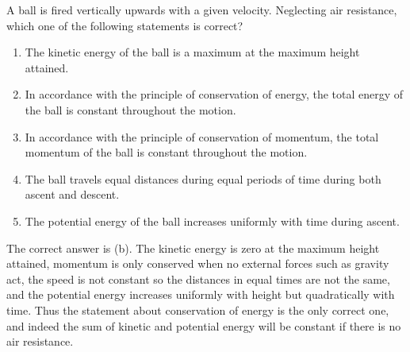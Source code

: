 
\begin{problem}[A1986PIQ4l] 
{A ball is fired vertically upwards with a given velocity. Neglecting air resistance, which one of the following statements is correct?
\begin{enumerate}
	\item The kinetic energy of the ball is a maximum at the maximum height attained.
	\item In accordance with the principle of conservation of energy, the total energy of the ball is constant throughout the motion. \answer
	\item In accordance with the principle of conservation of momentum, the total momentum of the ball is constant throughout the motion.
	\item The ball travels equal distances during equal periods of time during both ascent and descent. 
	\item The potential energy of the ball increases uniformly with time during ascent.
\end{enumerate}
}
{}
{The correct answer is (b). The kinetic energy is zero at the maximum height attained, momentum is only conserved when no external forces such as gravity act, the speed is not constant so the distances in equal times are not the same, and the potential energy increases uniformly with height but quadratically with time. Thus the statement about conservation of energy is the only correct one, and indeed the sum of kinetic and potential energy will be constant if there is no air resistance.}
\end{problem}